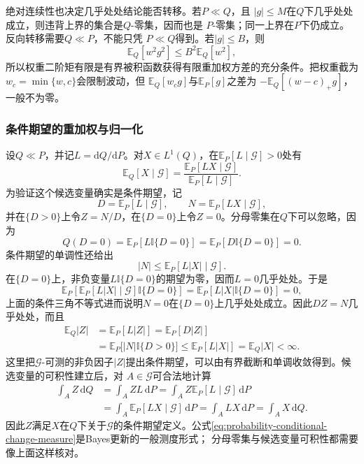绝对连续性也决定几乎处处结论能否转移。若\(P\ll Q\)，且
\(|g|\leq M\)在\(Q\)下几乎处处成立，则违背上界的集合是\(Q\)-零集，因而也是
\(P\)-零集；同一上界在\(P\)下仍成立。反向转移需要\(Q\ll P\)，不能只凭
\(P\ll Q\)得到。若\(|g|\leq B\)，则
\[
  \mathbb{E}_Q[w^2g^2]\leq B^2\mathbb{E}_Q[w^2],
\]
所以权重二阶矩有限是有界被积函数获得有限重加权方差的充分条件。把权重截为
\(w_c=\min\{w,c\}\)会限制波动，但
\(\mathbb{E}_Q[w_cg]\)与\(\mathbb{E}_P[g]\)之差为
\(-\mathbb{E}_Q[(w-c)_+g]\)，一般不为零。

\subsubsection{条件期望的重加权与归一化}
设\(Q\ll P\)，并记\(L=\mathrm{d}Q/\mathrm{d}P\)。对\(X\in L^1(Q)\)，在\(\mathbb{E}_P[L\mid\mathcal{G}]>0\)处有
\begin{equation}
  \mathbb{E}_Q[X\mid\mathcal{G}]
  =
  \frac{\mathbb{E}_P[LX\mid\mathcal{G}]}
       {\mathbb{E}_P[L\mid\mathcal{G}]}.
  \label{eq:probability-conditional-change-measure}
\end{equation}
为验证这个候选变量确实是条件期望，记
\[
  D=\mathbb{E}_P[L\mid\mathcal{G}],
  \qquad
  N=\mathbb{E}_P[LX\mid\mathcal{G}],
\]
并在\(\{D>0\}\)上令\(Z=N/D\)，在\(\{D=0\}\)上令\(Z=0\)。分母零集在\(Q\)下可以忽略，因为
\[
  Q(D=0)
  =
  \mathbb{E}_P[L\mathbb{I}\{D=0\}]
  =
  \mathbb{E}_P[D\mathbb{I}\{D=0\}]
  =0.
\]
条件期望的单调性还给出
\[
  |N|
  \leq
  \mathbb{E}_P[L|X|\mid\mathcal{G}].
\]
在\(\{D=0\}\)上，非负变量\(L\mathbb{I}\{D=0\}\)的期望为零，因而\(L=0\)几乎处处。于是
\[
  \mathbb{E}_P\left[
    \mathbb{E}_P[L|X|\mid\mathcal{G}]
    \mathbb{I}\{D=0\}
  \right]
  =
  \mathbb{E}_P[L|X|\mathbb{I}\{D=0\}]
  =0,
\]
上面的条件三角不等式进而说明\(N=0\)在\(\{D=0\}\)上几乎处处成立。因此\(DZ=N\)几乎处处，而且
\[
  \begin{aligned}
    \mathbb{E}_Q|Z|
    &=
    \mathbb{E}_P[L|Z|]
    =
    \mathbb{E}_P[D|Z|]\\
    &=
    \mathbb{E}_P\bigl[|N|\mathbb{I}\{D>0\}\bigr]
    \leq
    \mathbb{E}_P[L|X|]
    =
    \mathbb{E}_Q|X|<\infty.
  \end{aligned}
\]
这里把\(\mathcal{G}\)-可测的非负因子\(|Z|\)提出条件期望，可以由有界截断和单调收敛得到。候选变量的可积性建立后，对
\(A\in\mathcal{G}\)可合法地计算
\[
  \begin{aligned}
    \int_A Z\,\mathrm{d}Q
    &=
    \int_A ZL\,\mathrm{d}P
    =
    \int_A Z\mathbb{E}_P[L\mid\mathcal{G}]\,\mathrm{d}P\\
    &=
    \int_A \mathbb{E}_P[LX\mid\mathcal{G}]\,\mathrm{d}P
    =
    \int_A LX\,\mathrm{d}P
    =
    \int_A X\,\mathrm{d}Q.
  \end{aligned}
\]
因此\(Z\)满足\(X\)在\(Q\)下关于\(\mathcal{G}\)的条件期望定义。公式\eqref{eq:probability-conditional-change-measure}是Bayes更新的一般测度形式；
分母零集与候选变量可积性都需要像上面这样核对。

